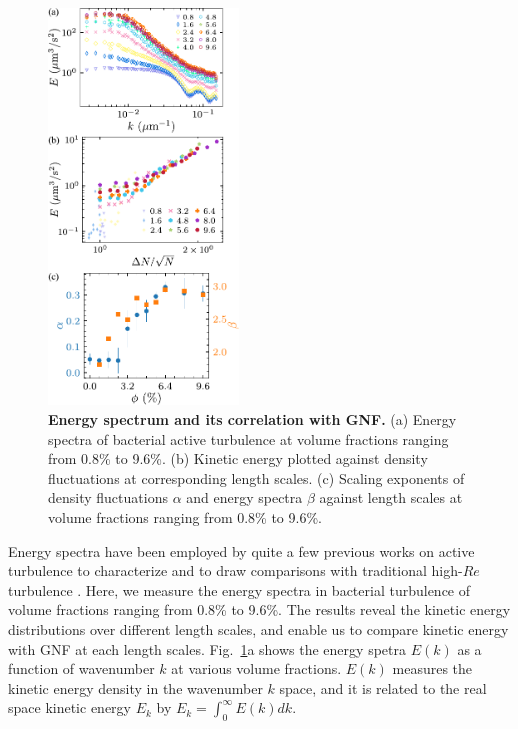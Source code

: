\documentclass[twocolumn,aps,prl,amsmath,amssymb,longbibliography]{revtex4-2}
\begin{document}
\begin{figure}[!]
\begin{center}
\includegraphics[width=0.45\textwidth]{figures/fig-8/v2.pdf}
\caption[Energy spectrum and its correlation with GNF]
{
\textbf{Energy spectrum and its correlation with GNF.}
(a) Energy spectra of bacterial active turbulence at volume fractions ranging from 0.8\% to 9.6\%.
(b) Kinetic energy plotted against density fluctuations at corresponding length scales.
(c) Scaling exponents of density fluctuations $\alpha$ and energy spectra $\beta$ against length scales at volume fractions ranging from 0.8\% to 9.6\%.
}
\label{energy-spectra}
\end{center}
\end{figure}
Energy spectra have been employed by quite a few previous works on active turbulence to characterize and to draw comparisons with traditional high-$Re$ turbulence
\cite{Ishikawa2011, Wensink2012, Dunkel2013b, Bratanov2015, Chatterjee2019, Karani2019,
 Skultety2020, Peng2020}. Here,
we measure the energy spectra in bacterial turbulence of volume fractions ranging from 0.8\% to 9.6\%.
The results reveal the kinetic energy distributions over different length scales, and enable us to compare kinetic energy with GNF at each length scales.
Fig.~\ref{energy-spectra}a shows the energy spetra $E(k)$ as a function of wavenumber $k$ at various volume fractions.
$E(k)$ measures the kinetic energy density in the wavenumber $k$ space, and it is related to the real space kinetic energy $E_k$ by $E_k = \int_0^\infty E(k)dk$.
\end{document}
